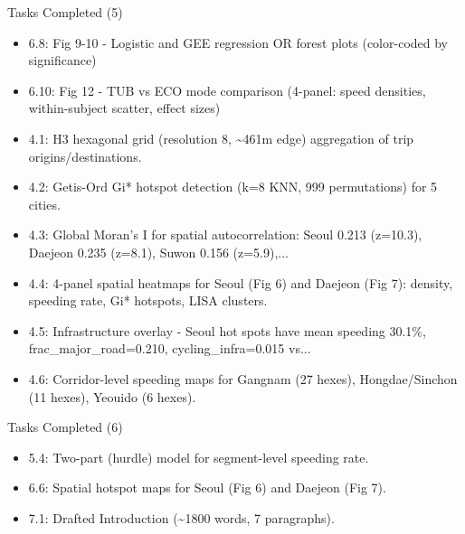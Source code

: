 \documentclass[aspectratio=169, 10pt]{beamer}
\begin{document}
\begin{frame}{Tasks Completed (5)}
\begin{itemize}\small
  \item 6.8: Fig 9-10 - Logistic and GEE regression OR forest plots (color-coded by significance)
  \item 6.10: Fig 12 - TUB vs ECO mode comparison (4-panel: speed densities, within-subject scatter, effect sizes)
  \item 4.1: H3 hexagonal grid (resolution 8, \textasciitilde{}461m edge) aggregation of trip origins/destinations.
  \item 4.2: Getis-Ord Gi* hotspot detection (k=8 KNN, 999 permutations) for 5 cities.
  \item 4.3: Global Moran's I for spatial autocorrelation: Seoul 0.213 (z=10.3), Daejeon 0.235 (z=8.1), Suwon 0.156 (z=5.9),...
  \item 4.4: 4-panel spatial heatmaps for Seoul (Fig 6) and Daejeon (Fig 7): density, speeding rate, Gi* hotspots, LISA clusters.
  \item 4.5: Infrastructure overlay - Seoul hot spots have mean speeding 30.1\%, frac\_major\_road=0.210, cycling\_infra=0.015 vs...
  \item 4.6: Corridor-level speeding maps for Gangnam (27 hexes), Hongdae/Sinchon (11 hexes), Yeouido (6 hexes).
\end{itemize}
\end{frame}

\begin{frame}{Tasks Completed (6)}
\begin{itemize}\small
  \item 5.4: Two-part (hurdle) model for segment-level speeding rate.
  \item 6.6: Spatial hotspot maps for Seoul (Fig 6) and Daejeon (Fig 7).
  \item 7.1: Drafted Introduction (\textasciitilde{}1800 words, 7 paragraphs).
\end{itemize}
\end{frame}
\end{document}

